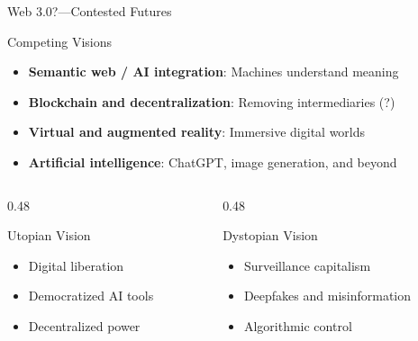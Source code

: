 \documentclass[aspectratio=169]{beamer}
\begin{document}
\begin{frame}{Web 3.0?---Contested Futures}
\begin{block}{Competing Visions}
\begin{itemize}
  \item \textbf{Semantic web / AI integration}: Machines understand meaning
  \item \textbf{Blockchain and decentralization}: Removing intermediaries (?)
  \item \textbf{Virtual and augmented reality}: Immersive digital worlds
  \item \textbf{Artificial intelligence}: ChatGPT, image generation, and beyond
\end{itemize}
\end{block}

\vspace{0.3em}
\begin{columns}
\begin{column}{0.48\textwidth}
\begin{exampleblock}{Utopian Vision}
\begin{itemize}
  \item Digital liberation
  \item Democratized AI tools
  \item Decentralized power
\end{itemize}
\end{exampleblock}
\end{column}

\begin{column}{0.48\textwidth}
\begin{alertblock}{Dystopian Vision}
\begin{itemize}
  \item Surveillance capitalism
  \item Deepfakes and misinformation
  \item Algorithmic control
\end{itemize}
\end{alertblock}
\end{column}
\end{columns}

\vspace{0.3em}
\end{frame}
\end{document}
